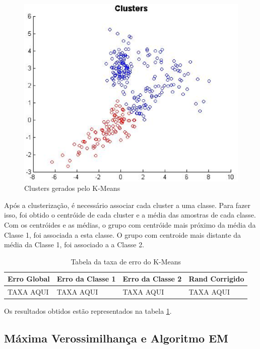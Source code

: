 \begin{figure}[H]
\center
\includegraphics[scale=0.60]{imagens/tecnicas/clusters.eps}
\caption{Clusters gerados pelo K-Means}
\label{fig:clusters}
\end{figure}

Após a clusterização, é necessário associar cada cluster a uma classe. Para fazer isso, foi obtido o centróide de cada cluster e a média das amostras de cada classe. Com os centróides e as médias, o grupo com centróide mais próximo da média da Classe 1, foi associada a esta classe. O grupo com centroide mais distante da média da Classe 1, foi associado a a Classe 2.


\begin{table}[H]
\begin{center}
\begin{tabular}{|l|l|l|l|}
\hline
Erro Global	&	Erro da Classe 1	&	Erro da Classe 2	&	Rand Corrigido	\\
\hline %
TAXA AQUI	&		TAXA AQUI		&		TAXA AQUI		&	TAXA AQUI		\\
\hline
\end{tabular}%
\end{center}   %
\caption{Tabela da taxa de erro do K-Means}
\label{tab:erro-kmeans}
\end{table}

Os resultados obtidos estão representados na tabela \ref{tab:erro-kmeans}.


\subsection{Máxima Verossimilhança e Algoritmo EM}
\label{subsec:exp-mle-em}

